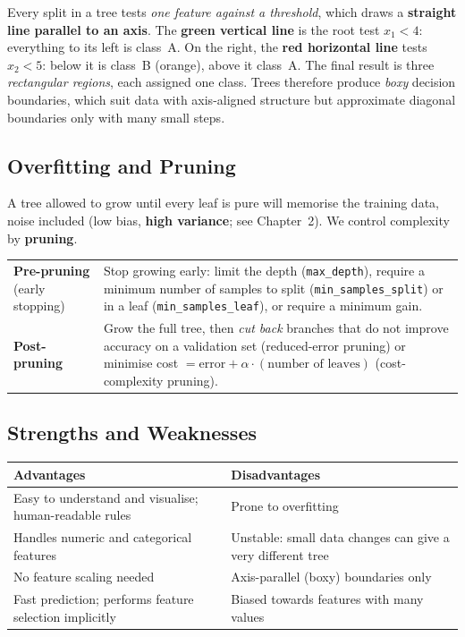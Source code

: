 \begin{explain}
Every split in a tree tests \emph{one feature against a threshold}, which draws a \textbf{straight line parallel to an axis}. The \textbf{green vertical line} is the root test $x_1<4$: everything to its left is class~A. On the right, the \textbf{red horizontal line} tests $x_2<5$: below it is class~B (orange), above it class~A. The final result is three \emph{rectangular regions}, each assigned one class. Trees therefore produce \emph{boxy} decision boundaries, which suit data with axis-aligned structure but approximate diagonal boundaries only with many small steps.
\end{explain}


\subsection{Overfitting and Pruning}

A tree allowed to grow until every leaf is pure will memorise the training data, noise included (low bias, \textbf{high variance}; see Chapter~2). We control complexity by \textbf{pruning}.

\begin{center}
\begin{tabular}{@{}p{3.3cm}p{10.2cm}@{}}
\toprule
\textbf{Pre-pruning} (early stopping) & Stop growing early: limit the depth (\texttt{max\_depth}), require a minimum number of samples to split (\texttt{min\_samples\_split}) or in a leaf (\texttt{min\_samples\_leaf}), or require a minimum gain.\\
\textbf{Post-pruning} & Grow the full tree, then \emph{cut back} branches that do not improve accuracy on a validation set (reduced-error pruning) or minimise cost $=\text{error}+\alpha\cdot(\text{number of leaves})$ (cost-complexity pruning).\\
\bottomrule
\end{tabular}
\end{center}

\subsection{Strengths and Weaknesses}

\begin{center}
\begin{tabular}{@{}p{6.7cm}p{6.7cm}@{}}
\toprule
\textbf{Advantages} & \textbf{Disadvantages}\\
\midrule
Easy to understand and visualise; human-readable rules & Prone to overfitting\\
Handles numeric and categorical features & Unstable: small data changes can give a very different tree\\
No feature scaling needed & Axis-parallel (boxy) boundaries only\\
Fast prediction; performs feature selection implicitly & Biased towards features with many values\\
\bottomrule
\end{tabular}
\end{center}

